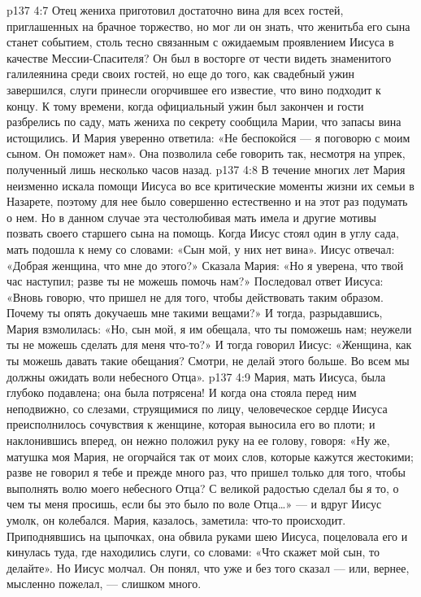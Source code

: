 \vs p137 4:7 \pc Отец жениха приготовил достаточно вина для всех гостей, приглашенных на брачное торжество, но мог ли он знать, что женитьба его сына станет событием, столь тесно связанным с ожидаемым проявлением Иисуса в качестве Мессии\hyp{}Спасителя? Он был в восторге от чести видеть знаменитого галилеянина среди своих гостей, но еще до того, как свадебный ужин завершился, слуги принесли огорчившее его известие, что вино подходит к концу. К тому времени, когда официальный ужин был закончен и гости разбрелись по саду, мать жениха по секрету сообщила Марии, что запасы вина истощились. И Мария уверенно ответила: «Не беспокойся --- я поговорю с моим сыном. Он поможет нам». Она позволила себе говорить так, несмотря на упрек, полученный лишь несколько часов назад.
\vs p137 4:8 В течение многих лет Мария неизменно искала помощи Иисуса во все критические моменты жизни их семьи в Назарете, поэтому для нее было совершенно естественно и на этот раз подумать о нем. Но в данном случае эта честолюбивая мать имела и другие мотивы позвать своего старшего сына на помощь. Когда Иисус стоял один в углу сада, мать подошла к нему со словами: «Сын мой, у них нет вина». Иисус отвечал: «Добрая женщина, что мне до этого?» Сказала Мария: «Но я уверена, что твой час наступил; разве ты не можешь помочь нам?» Последовал ответ Иисуса: «Вновь говорю, что пришел не для того, чтобы действовать таким образом. Почему ты опять докучаешь мне такими вещами?» И тогда, разрыдавшись, Мария взмолилась: «Но, сын мой, я им обещала, что ты поможешь нам; неужели ты не можешь сделать для меня что\hyp{}то?» И тогда говорил Иисус: «Женщина, как ты можешь давать такие обещания? Смотри, не делай этого больше. Во всем мы должны ожидать воли небесного Отца».
\vs p137 4:9 Мария, мать Иисуса, была глубоко подавлена; она была потрясена! И когда она стояла перед ним неподвижно, со слезами, струящимися по лицу, человеческое сердце Иисуса преисполнилось сочувствия к женщине, которая выносила его во плоти; и наклонившись вперед, он нежно положил руку на ее голову, говоря: «Ну же, матушка моя Мария, не огорчайся так от моих слов, которые кажутся жестокими; разве не говорил я тебе и прежде много раз, что пришел только для того, чтобы выполнять волю моего небесного Отца? С великой радостью сделал бы я то, о чем ты меня просишь, если бы это было по воле Отца\ldots » --- и вдруг Иисус умолк, он колебался. Мария, казалось, заметила: что\hyp{}то происходит. Приподнявшись на цыпочках, она обвила руками шею Иисуса, поцеловала его и кинулась туда, где находились слуги, со словами: «Что скажет мой сын, то делайте». Но Иисус молчал. Он понял, что уже и без того сказал --- или, вернее, мысленно пожелал, --- слишком много.
